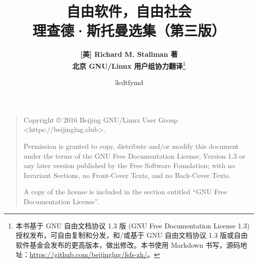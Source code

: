\documentclass[a5paper, UTF8, openright]{book}
\title{\huge{\textbf{自由软件，自由社会}}\\
理查德·斯托曼选集（第三版）}
\title{{\savedtitle}}
\author{\textbf{[美] Richard M. Stallman 著}\\
       \textbf{北京 GNU/Linux 用户组协力翻译}\thanks{本书基于 GNU 自由文档协议 1.3 版 (GNU Free Documentation License 1.3) 授权发布，可自由复制和分发，和/或基于 GNU 自由文档协议 1.3 版或自由软件基金会发布的更高版本，做出修改。本书使用 Markdown 书写，源码地址：\url{https://github.com/beijinglug/fsfs-zh/}。}}
\date{\w3cdtfymd}
\renewcommand{\headrulewidth}{0pt}
\newcounter{img}[chapter]
\newcounter{tab}[chapter]
\newcommand{\prechap}{第}
\newcommand{\postchap}{部分}
\renewcommand{\appendixname}{附录 }
\begin{document}
%
\maketitle

\begin{quote}
\noindent
Copyright \copyright{} 2016 Beijing GNU/Linux User Group <https://beijinglug.club>.

\noindent
Permission is granted to copy, distribute and/or modify this document under the terms of the GNU Free Documentation License, Version 1.3 or any later version published by the Free Software Foundation; with no Invariant Sections, no Front-Cover Texts, and no Back-Cover Texts.

\noindent
A copy of the license is included in the section entitled ``GNU Free Documentation License''.
\end{quote}

\thispagestyle{empty}
\setcounter{tocdepth}{1}

\frontmatter

\tableofcontents\newpage\thispagestyle{empty}


\fancyhf{}
\fancyhead[LE]{\color{colorheader}\quad\small\textbf\thepage\quad\quad\small\leftmark}
\fancyhead[RO]{\color{colorheader}\small\rightmark\quad\quad\small\textbf\thepage\quad}
\fancyfoot[LE,RO]{\small\textbf\thepage} %

\renewcommand{\headrulewidth}{0.4pt}  %
\pagestyle{fancy}

\mainmatter

\appendices
\renewcommand{\prechap}{\appendixname}
\renewcommand{\postchap}{}

\end{document}
